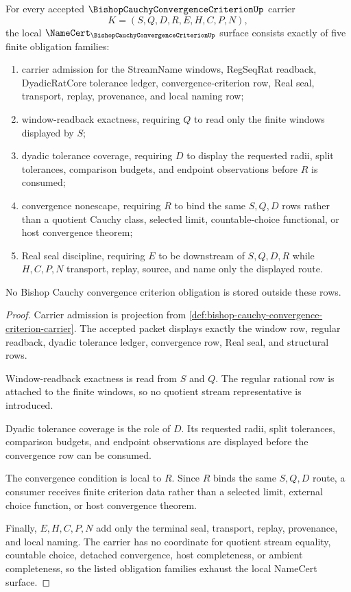 \begin{theorem}
\label{thm:bishop-cauchy-convergence-criterion-namecert-obligations}
For every accepted $\BishopCauchyConvergenceCriterionUp$ carrier
$$
K=(S,Q,D,R,E,H,C,P,N),
$$
the local $\NameCert_{\BishopCauchyConvergenceCriterionUp}$ surface consists exactly of five finite obligation families:
\begin{enumerate}
\item carrier admission for the StreamName windows, RegSeqRat readback, DyadicRatCore tolerance ledger, convergence-criterion row, Real seal, transport, replay, provenance, and local naming row;
\item window-readback exactness, requiring $Q$ to read only the finite windows displayed by $S$;
\item dyadic tolerance coverage, requiring $D$ to display the requested radii, split tolerances, comparison budgets, and endpoint observations before $R$ is consumed;
\item convergence nonescape, requiring $R$ to bind the same $S,Q,D$ rows rather than a quotient Cauchy class, selected limit, countable-choice functional, or host convergence theorem;
\item Real seal discipline, requiring $E$ to be downstream of $S,Q,D,R$ while $H,C,P,N$ transport, replay, source, and name only the displayed route.
\end{enumerate}
No Bishop Cauchy convergence criterion obligation is stored outside these rows.
\end{theorem}
\begin{proof}
Carrier admission is projection from \autoref{def:bishop-cauchy-convergence-criterion-carrier}. The accepted packet displays exactly the window row, regular readback, dyadic tolerance ledger, convergence row, Real seal, and structural rows.

Window-readback exactness is read from $S$ and $Q$. The regular rational row is attached to the finite windows, so no quotient stream representative is introduced.

Dyadic tolerance coverage is the role of $D$. Its requested radii, split tolerances, comparison budgets, and endpoint observations are displayed before the convergence row can be consumed.

The convergence condition is local to $R$. Since $R$ binds the same $S,Q,D$ route, a consumer receives finite criterion data rather than a selected limit, external choice function, or host convergence theorem.

Finally, $E,H,C,P,N$ add only the terminal seal, transport, replay, provenance, and local naming. The carrier has no coordinate for quotient stream equality, countable choice, detached convergence, host completeness, or ambient completeness, so the listed obligation families exhaust the local NameCert surface.
\end{proof}

